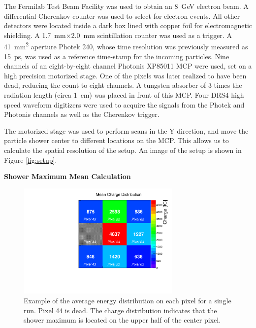 \documentclass[twocolumn]{article}
\begin{document}
The Fermilab Test Beam Facility was used to obtain an \SI{8}{\giga\electronvolt} electron beam.
A differential Cherenkov counter was used to select for electron events.
All other detectors were located inside a dark box lined with copper foil for electromagnetic shielding.
A \SI{1.7}{\milli\meter}$\times$\SI{2.0}{\milli\meter} scintillation counter was used as a trigger.
A \SI{41}{\milli\meter\squared} aperture Photek 240, whose time resolution was previously measured as \SI{15}{\pico\second}, was used as a reference time-stamp for the incoming particles.
Nine channels of an eight-by-eight channel Photonis XP85011 MCP were used, set on a high precision motorized stage. One of the pixels was later realized to have been dead, reducing the count to eight channels.
A tungsten absorber of 3 times the radiation length (circa \SI{1}{\centi\meter}) was placed in front of this MCP.
Four DRS4 high speed waveform digitizers were used to acquire the signals from the Photek and Photonis channels as well as the Cherenkov trigger.

The motorized stage was used to perform scans in the Y direction, and move the particle shower center to different locations on the MCP. This allows us to calculate the spatial resolution of the setup. An image of the setup is shown in Figure \ref{fig:setup}.



\title{\large}{\textbf{Shower Maximum Mean Calculation}}

\begin{figure}[htbp]
	\centering
	\includegraphics[width=8cm]{Images/exavint/exintrun30.pdf}
	\caption{\small Example of the average energy distribution on each pixel for a single run. Pixel 44 is dead. The charge distribution indicates that the shower maximum is located on the upper half of the center pixel.}
	\label{fig:exavint}
\end{figure}
\end{document}
